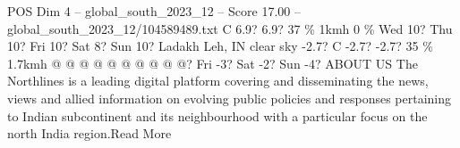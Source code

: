 \begin{textsample}{POS Dim 4 – global\_south\_2023\_12 – Score 17.00 – global\_south\_2023\_12/104589489.txt}
C 6.9? 6.9? 37 \% 1kmh 0 \% Wed 10?
Thu 10?
Fri 10?
Sat 8?
Sun 10?
Ladakh Leh, IN clear sky -2.7?
C -2.7? -2.7? 35 \% 1.7kmh @ @ @ @ @ @ @ @ @ @?
Fri -3?
Sat -2?
Sun -4?
ABOUT US The Northlines is a leading digital platform covering and disseminating the news, views and allied information on evolving public policies and responses pertaining to Indian subcontinent and its neighbourhood with a particular focus on the north India region.Read More

\end{textsample}
